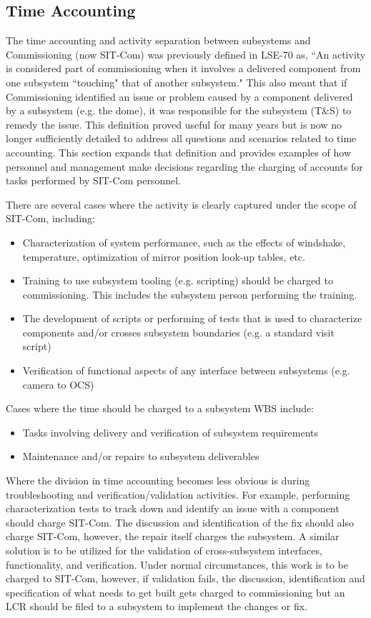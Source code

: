 \documentclass[SE,lsstdraft,authoryear,toc]{lsstdoc}
\begin{document}
\subsection{Time Accounting}
\label{sec:time}

The time accounting and activity separation between subsystems and Commissioning (now SIT-Com) was previously defined in LSE-70 as, ``An activity is considered part of commissioning when it involves a delivered component from one subsystem ``touching" that of another subsystem."
This also meant that if Commissioning identified an issue or problem caused by a component delivered by a subsystem (e.g. the dome), it was responsible for the subsystem (T\&S) to remedy the issue.
This definition proved useful for many years but is now no longer sufficiently detailed to address all questions and scenarios related to time accounting.
This section expands that definition and provides examples of how personnel and management make decisions regarding the charging of accounts for tasks performed by SIT-Com personnel.

There are several cases where the activity is clearly captured under the scope of SIT-Com, including:
\begin{itemize}
    \item Characterization of system performance, such as the effects of windshake, temperature, optimization of mirror position look-up tables, etc.
    \item Training to use subsystem tooling (e.g. scripting) should be charged to commissioning. This includes the subsystem person performing the training.
    \item The development of scripts or performing of tests that is used to characterize components and/or crosses subsystem boundaries (e.g. a standard visit script)
    \item Verification of functional aspects of any interface between subsystems (e.g. camera to OCS)
\end{itemize}

Cases where the time should be charged to a subsystem WBS include:
\begin{itemize}
    \item Tasks involving delivery and verification of subsystem requirements
    \item Maintenance and/or repairs to subsystem deliverables
\end{itemize}


Where the division in time accounting becomes less obvious is during troubleshooting and verification/validation activities.
For example, performing characterization tests to track down and identify an issue with a component should charge SIT-Com.
The discussion and identification of the fix should also charge SIT-Com, however, the repair itself charges the subsystem.
A similar solution is to be utilized for the validation of cross-subsystem interfaces, functionality, and verification.
Under normal circumstances, this work is to be charged to SIT-Com, however, if validation fails, the discussion, identification and specification of what needs to get built gets charged to commissioning but an LCR should be filed to a subsystem to implement the changes or fix.
\end{document}
